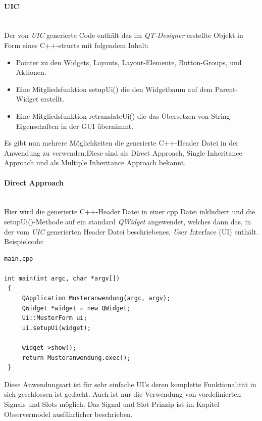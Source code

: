 \paragraph{UIC}\mbox{}\\
Der von \textit{UIC} generierte Code enthält das im \textit{QT-Designer} erstellte Objekt in Form eines C++-structs mit folgendem Inhalt:
\begin{itemize}
	\item Pointer zu den Widgets, Layouts, Layout-Elemente, Button-Groups, und Aktionen.
	\item Eine Mitgliedsfunktion setupUi() die den Widgetbaum auf dem Parent-Widget erstellt.
	\item Eine Mitgliedsfunktion retranslateUi() die das Übersetzen von String-Eigenschaften in der GUI übernimmt.
\end{itemize}
Es gibt nun mehrere Möglichkeiten die generierte C++-Header Datei in der Anwendung zu verwenden.Diese sind als Direct Approach, Single Inheritance Approach und als Multiple Inheritance Approach bekannt.
\newpage
\paragraph{Direct Approach}\mbox{}\\
Hier wird die generierte C++-Header Datei in einer cpp Datei inkludiert und die setupUi()-Methode auf ein standard \textit{QWidget} angewendet, welches dann das, in der vom \textit{UIC} generierten Header Datei beschriebenes, \textit{U}ser \textit{I}nterface (UI) enthält.\\Beispielcode:
\begin{lstlisting}
main.cpp

int main(int argc, char *argv[])
 {
     QApplication Musteranwendung(argc, argv);
     QWidget *widget = new QWidget;
     Ui::MusterForm ui;
     ui.setupUi(widget);

     widget->show();
     return Musteranwendung.exec();
 }
\end{lstlisting}
Diese Anwendungsart ist für sehr einfache UI’s deren komplette Funktionalität in sich geschlossen ist gedacht. Auch ist nur die Verwendung von vordefinierten Signals und Slots möglich. Das Signal und Slot Prinzip ist im Kapitel Observermodel ausführlicher beschrieben.
\newpage
